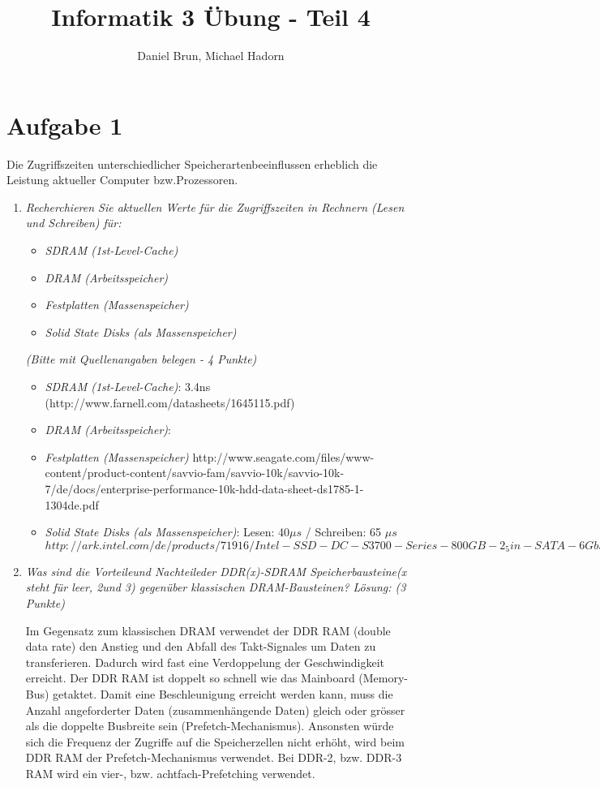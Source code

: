 \documentclass[10pt]{article}
\title{Informatik 3 Übung - Teil 4\vspace{-2ex}}
\author{Daniel Brun, Michael Hadorn\vspace{-2ex}}
\begin{document}
\maketitle

\section*{Aufgabe 1}
Die Zugriffszeiten unterschiedlicher Speicherartenbeeinflussen erheblich die Leistung aktueller Computer bzw.Prozessoren.
\begin{enumerate}[label=\alph*)]
	\item
		\textit{Recherchieren Sie aktuellen Werte für die Zugriffszeiten in Rechnern (Lesen und Schreiben) für:}
		\begin{itemize}
			\item \textit{SDRAM (1st-Level-Cache)}
			\item \textit{DRAM (Arbeitsspeicher)}
			\item \textit{Festplatten (Massenspeicher)}
			\item \textit{Solid State Disks (als Massenspeicher)}
		\end{itemize}
		\textit{(Bitte mit Quellenangaben belegen - 4 Punkte)}
		
		\begin{itemize}
			\item \textit{SDRAM (1st-Level-Cache)}: 3.4ns (http://www.farnell.com/datasheets/1645115.pdf)
			\item \textit{DRAM (Arbeitsspeicher)}:  %
			\item \textit{Festplatten (Massenspeicher)} http://www.seagate.com/files/www-content/product-content/savvio-fam/savvio-10k/savvio-10k-7/de/docs/enterprise-performance-10k-hdd-data-sheet-ds1785-1-1304de.pdf
			\item \textit{Solid State Disks (als Massenspeicher)}: Lesen: 40$\mu s$ / Schreiben: 65 $\mu s$ $http://ark.intel.com/de/products/71916/Intel-SSD-DC-S3700-Series-800GB-2_5in-SATA-6Gbs-25nm-MLC$
		\end{itemize}
		\item 
			\textit{Was sind die Vorteileund Nachteileder DDR(x)-SDRAM Speicherbausteine(x steht für leer, 2und 3) gegenüber klassischen  DRAM-Bausteinen? Lösung: (3 Punkte)}
		
		Im Gegensatz zum klassischen DRAM verwendet der DDR RAM (double data rate) den Anstieg und den Abfall des Takt-Signales um Daten zu transferieren. Dadurch wird fast eine Verdoppelung der Geschwindigkeit erreicht. Der DDR RAM ist doppelt so schnell wie das Mainboard (Memory-Bus) getaktet. Damit eine Beschleunigung erreicht werden kann, muss die Anzahl angeforderter Daten (zusammenhängende Daten) gleich oder grösser als die doppelte Busbreite sein (Prefetch-Mechanismus). Ansonsten würde sich die Frequenz der Zugriffe auf die Speicherzellen nicht erhöht, wird beim DDR RAM der Prefetch-Mechanismus verwendet. Bei DDR-2, bzw. DDR-3 RAM wird ein vier-, bzw. achtfach-Prefetching verwendet. 
		

\end{enumerate}
\end{document}
